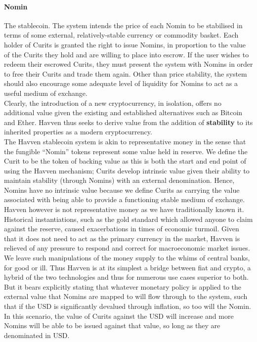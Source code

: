 \paragraph{Nomin} The stablecoin. The system intends the price of each Nomin to be stabilised in terms of some
external, relatively-stable currency or commodity basket. Each holder of Curits is granted the right to issue
Nomins, in proportion to the value of the Curits they hold and are willing to place into escrow.
If the user wishes to redeem their escrowed Curits, they must present the system with Nomins in order to free
their Curits and trade them again. Other than price stability, the system should also encourage some adequate
level of liquidity for Nomins to act as a useful medium of exchange. \\

\noindent Clearly, the introduction of a new cryptocurrency, in isolation, offers no additional value given
the existing and established alternatives such as Bitcoin and Ether. Havven thus seeks to derive value from the
addition of \textbf{stability} to its inherited properties as a modern cryptocurrency. \\

\noindent The Havven stablecoin system is akin to representative money in the sense that the fungible ``Nomin''
tokens represent some value held in reserve. We define the Curit to be the token of backing value as this is
both the start and end point of using the Havven mechanism; Curits develop intrinsic value given their ability
to maintain stability (through Nomins) with an external denomination. Hence, Nomins have no intrinsic value
because we define Curits as carrying the value associated with being able to provide a functioning stable
medium of exchange. \\

\noindent Havven however is not representative money as we have traditionally known it. Historical instantiations,
such as the gold standard which allowed anyone to claim against the reserve, caused exacerbations in times of
economic turmoil. Given that it does not need to act as the primary currency in the market, Havven is relieved
of any pressure to respond and correct for macroeconomic market issues. We leave such manipulations of the money
supply to the whims of central banks, for good or ill. Thus Havven is at its simplest a bridge between fiat and
crypto, a hybrid of the two technologies and thus for numerous use cases superior to both. But it bears
explicitly stating that whatever monetary policy is applied to the external value that Nomins are mapped to will
flow through to the system, such that if the USD is significantly devalued through inflation, so too will the
Nomin. In this scenario, the value of Curits against the USD will increase and more Nomins will be able to be
issued against that value, so long as they are denominated in USD. \\

